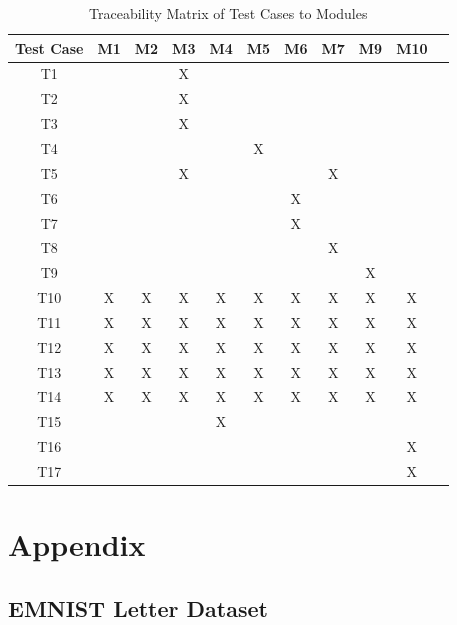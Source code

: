 \documentclass[12pt, titlepage]{article}
\begin{document}
\begin{table}[h]
\centering
\begin{tabular}{|c|c|c|c|c|c|c|c|c|c|c|}
\hline
\textbf{Test Case} & \textbf{M1} & \textbf{M2} & \textbf{M3} & \textbf{M4} & \textbf{M5} & \textbf{M6} & \textbf{M7} & \textbf{M9} & \textbf{M10} \\ \hline
T1 &  &  & X &  &  &  &  &  &  \\ \hline
T2 &  &  & X &  &  &  &  &  &  \\ \hline
T3 &  &  & X &  &  &  &  &  &  \\ \hline
T4 &  &  &   &  & X &  &  &  &  \\ \hline
T5 &  &  & X &  &   &  & X &  &  \\ \hline
T6 &  &  &  &  &  & X &  &  &  \\ \hline
T7 &  &  &  &  &  & X &  &  &  \\ \hline
T8 &  &  &  &  &  &  & X &  &  \\ \hline
T9 &  &  &  &  &  &  &  & X &  \\ \hline
T10 & X & X & X & X & X & X & X & X & X \\ \hline
T11 & X & X & X & X & X & X & X & X & X \\ \hline
T12 & X & X & X & X & X & X & X & X & X \\ \hline
T13 & X & X & X & X & X & X & X & X & X \\ \hline
T14 & X & X & X & X & X & X & X & X & X \\ \hline
T15 &  &  &  & X &  &  &  &  &  \\ \hline
T16 &  &  &  &  &  &  &  &  & X \\ \hline
T17 &  &  &  &  &  &  &  &  & X \\ \hline
\end{tabular}
\caption{Traceability Matrix of Test Cases to Modules}
\label{tab:traceability-matrix}
\end{table}





\newpage

\section{Appendix}

\subsection{EMNIST Letter Dataset}
\label{sec:EMNISTLetters}
\end{document}
